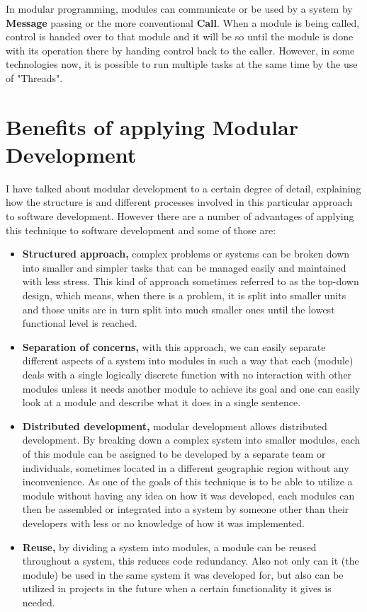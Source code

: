 In modular programming, modules can communicate or be used by a system by {\bf Message} passing or the more conventional {\bf Call}. When a module is being called, control is handed over to that module and it will be so until the module is done with its operation there by handing control back to the caller. However, in some technologies now, it is possible to run multiple tasks at the same time by the use of "Threads".

\section{Benefits of applying Modular Development}
I have talked about modular development to a certain degree of detail, explaining how the structure is and different processes involved in this particular approach to software development. However there are a number of advantages of applying this technique to software development and some of those are: 
\begin{itemize}
\item{\bf Structured approach,} complex problems or systems can be broken down into smaller and simpler tasks that can be managed easily and maintained with less stress. This kind of approach sometimes referred to as the top-down design, which means, when there is a problem, it is split into smaller units and those units are in turn split into much smaller ones until the lowest functional level is reached.
\item{\bf Separation of concerns,} with this approach, we can easily separate different aspects of a system into modules in such a way that each (module) deals with a single logically discrete function with no interaction with other modules unless it needs another module to achieve its goal and one can easily look at a module and describe what it does in a single sentence. 
\item{\bf Distributed development,} modular development allows distributed development. By breaking down a complex system into smaller modules, each of this module can be assigned to be developed by a separate team or individuals, sometimes located in a different geographic region without any inconvenience. As one of the goals of this technique is to be able to utilize a module without having any idea on how it was developed, each modules can then be assembled or integrated into a system by someone other than their developers with less or no knowledge of how it was implemented.
\item{\bf Reuse,} by dividing a system into modules, a module can be reused throughout a system, this reduces code redundancy. Also not only can it (the module) be used in the same system it was developed for, but also can be utilized in projects in the future when a certain functionality it gives is needed.   
\end{itemize} 
